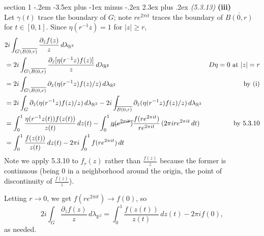 \documentclass[12pt]{article}
\makeatletter
\theoremstyle{norm}
\newcommand{\R}[0]{\mathbb{R}}
\newcommand{\la}[0]{\lambda}
\newcommand{\subprob}[1]{\noindent\textbf{#1}\\}
\newcommand{\bs}[0]{\backslash}
\newcommand{\ol}[1]{\overline{#1}}
\newenvironment{problem}{\@startsection
       {section}
       {1}
       {-.2em}
       {-3.5ex plus -1ex minus -.2ex}
       {2.3ex plus .2ex}
       {\pagebreak[3]%
       \large\bf\noindent{Problem }
       }
       }
       {%
       }
\makeatother
\begin{document}
\begin{problem}{\it(5.3.13)}
\subprob{(iii)}
Let $\gamma(t)$ trace the boundary of $G$; note $re^{2\pi it}$ traces the boundary of $\ol{B(0,r)}$ for $t\in [0,1]$. 
Since $\eta(r^{-1}z)=1$ for $|z|\ge r$, 
\begin{align*}
&2i\int_{G\bs \ol{B(0,r)}}\frac{\partial_{\bar z}f(z)}{z}\,d\la_{\R^2}\\
&=2i\int_{G\bs \ol{B(0,r)}}\frac{\partial_{\bar z}[\eta(r^{-1}z)f(z)]}{z}\,d\la_{\R^2}&D\eta=0\text{ at }|z|=r\\
&=2i\int_{G\bs \ol{B(0,r)}}\partial_{\bar z}(%
\eta(r^{-1}z)f(z)/z%
)
\,d\la_{\R^2}&\text{by (i)}\\
&=2i\int_{G}\partial_{\bar z}(%
\eta(r^{-1}z)f(z)/z%
)
\,d\la_{\R^2}-2i\int_{\ol{B(0,r)}}\partial_{\bar z}(%
\eta(r^{-1}z)f(z)/z%
)
\,d\la_{\R^2}\\
&=\int_{0}^1\frac{\eta(r^{-1}z(t))f(z(t))}{z(t)}\,dz(t)-  \int_0^1 \cancel{\eta(e^{2\pi it})} \frac{f(re^{2\pi it})}{re^{2\pi it}}\,(2\pi ir e^{2\pi it}\,dt)&\text{by 5.3.10}\\
&=\int_{0}^1\frac{f(z(t))}{z(t)}\,dz(t)-2\pi i\int_0^1 f(re^{2\pi it})\,dt
\end{align*}
Note we apply 5.3.10 to $f_r(z)$ rather than $\frac{f(z)}{z}$ because the former is continuous (being 0 in a neighborhood around the origin, the point of discontinuity of $\frac{f(z)}{z}$). 

Letting $r\to 0$, we get $f(re^{2\pi it})\to f(0)$, so
\[
2i\int_{G} \frac{\partial_{\ol z}f(z)}{z}\,d\la_{\R^2}
=\int_0^1 \frac{f(z(t))}{z(t)}\,dz(t)-2\pi if(0),
\]
as needed.
\end{problem}
\end{document}
